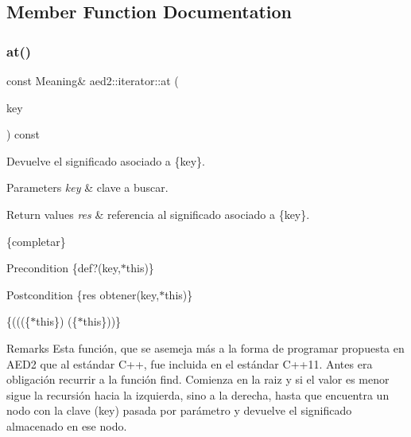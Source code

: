 \subsection{Member Function Documentation}
\mbox{\label{classaed2_1_1iterator_a5a443b1a5d288b9512a6698b92cb415d}} 
\subsubsection{\texorpdfstring{at()}{at()}\hspace{0.1cm}{\footnotesize\ttfamily [1/2]}}
{\footnotesize\ttfamily const Meaning\& aed2\+::iterator\+::at (\begin{DoxyParamCaption}\item[{const Key \&}]{key }\end{DoxyParamCaption}) const\hspace{0.3cm}{\ttfamily [inline]}}



Devuelve el significado asociado a \{key\}. 


\begin{DoxyParams}{Parameters}
{\em key} & clave a buscar. \\
\hline
\end{DoxyParams}

\begin{DoxyRetVals}{Return values}
{\em res} & referencia al significado asociado a \{key\}.\\
\hline
\end{DoxyRetVals}
\{completar\}

\begin{DoxyPrecond}{Precondition}
\{def?(key,$\ast$this)\}
\end{DoxyPrecond}
\begin{DoxyPostcond}{Postcondition}
\{res  obtener(key,$\ast$this)\}
\end{DoxyPostcond}
\{(((\{$\ast$this\})  (\{$\ast$this\}))\}

\begin{DoxyRemark}{Remarks}
Esta función, que se asemeja más a la forma de programar propuesta en A\+E\+D2 que al estándar C++, fue incluida en el estándar C++11. Antes era obligación recurrir a la función find. Comienza en la raiz y si el valor es menor sigue la recursión hacia la izquierda, sino a la derecha, hasta que encuentra un nodo con la clave (key) pasada por parámetro y devuelve el significado almacenado en ese nodo. 
\end{DoxyRemark}
\mbox{\label{classaed2_1_1iterator_ac0459c685868fba041b9be2cde974119}} 
